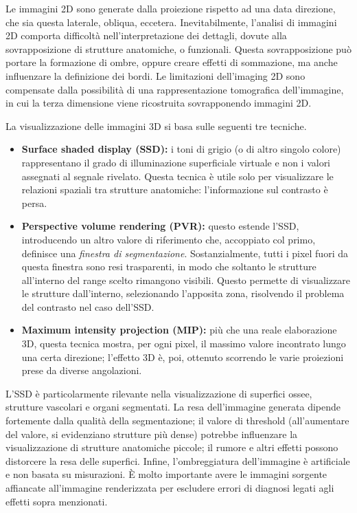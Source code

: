 \documentclass[11pt, a4paper]{scrartcl}
\theoremstyle{style}
\theoremstyle{style1}
\numberwithin{equation}{subsection}
\begin{document}
Le immagini 2D sono generate dalla proiezione rispetto ad una data direzione, che sia questa laterale, obliqua, eccetera. 
Inevitabilmente, l'analisi di immagini 2D comporta difficolt\`a nell'interpretazione dei dettagli, dovute alla sovrapposizione di strutture anatomiche, o funzionali.
Questa sovrapposizione pu\`o portare la formazione di ombre, oppure creare effetti di sommazione, ma anche influenzare la definizione dei bordi.
Le limitazioni dell'imaging 2D sono compensate dalla possibilit\`a di una rappresentazione tomografica dell'immagine, in cui la terza dimensione viene ricostruita sovrapponendo immagini 2D.

La visualizzazione delle immagini 3D si basa sulle seguenti tre tecniche.
\begin{itemize}
	\item \textbf{Surface shaded display (SSD):} i toni di grigio (o di altro singolo colore) rappresentano il grado di illuminazione superficiale virtuale e non i valori assegnati al segnale rivelato. 
		Questa tecnica \`e utile solo per visualizzare le relazioni spaziali tra strutture anatomiche: l'informazione sul contrasto \`e persa.
	\item \textbf{Perspective volume rendering (PVR):} questo estende l'SSD, introducendo un altro valore di riferimento che, accoppiato col primo, definisce una \textit{finestra di segmentazione}. 
		Sostanzialmente, tutti i pixel fuori da questa finestra sono resi trasparenti, in modo che soltanto le strutture all'interno del range scelto rimangono visibili.
		Questo permette di visualizzare le strutture dall'interno, selezionando l'apposita zona, risolvendo il problema del contrasto nel caso dell'SSD.
	\item \textbf{Maximum intensity projection (MIP):} pi\`u che una reale elaborazione 3D, questa tecnica mostra, per ogni pixel, il massimo valore incontrato lungo una certa direzione; l'effetto 3D \`e, poi, ottenuto scorrendo le varie proiezioni prese da diverse angolazioni.
\end{itemize}
L'SSD \`e particolarmente rilevante nella visualizzazione di superfici ossee, strutture vascolari e organi segmentati.
La resa dell'immagine generata dipende fortemente dalla qualit\`a della segmentazione; il valore di threshold (all'aumentare del valore, si evidenziano strutture pi\`u dense) potrebbe influenzare la visualizzazione di strutture anatomiche piccole; il rumore e altri effetti possono distorcere la resa delle superfici.
Infine, l'ombreggiatura dell'immagine \`e artificiale e non basata su misurazioni.
\`E molto importante avere le immagini sorgente affiancate all'immagine renderizzata per escludere errori di diagnosi legati agli effetti sopra menzionati.
\end{document}
